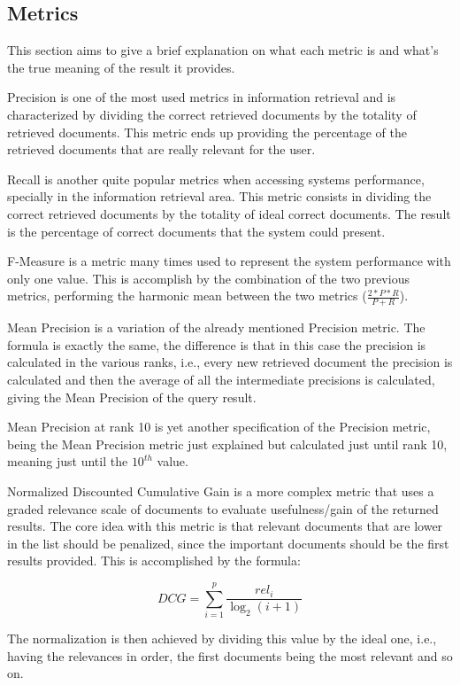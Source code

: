 \documentclass[12pt]{article}
\begin{document}
\subsection{Metrics}
This section aims to give a brief explanation on what each metric is and what's the true meaning of the result it provides.

Precision is one of the most used metrics in information retrieval and is characterized by dividing the correct retrieved documents by the totality of retrieved documents. This metric ends up providing the percentage of the retrieved documents that are really relevant for the user.

Recall is another quite popular metrics when accessing systems performance, specially in the information retrieval area. This metric consists in dividing the correct retrieved documents by the totality of ideal correct documents. The result is the percentage of correct documents that the system could present.

F-Measure is a metric many times used to represent the system performance with only one value. This is accomplish by the combination of the two previous metrics, performing the harmonic mean between the two metrics ($\frac{2*P*R}{P+R}$).

Mean Precision is a variation of the already mentioned Precision metric. The formula is exactly the same, the difference is that in this case the precision is calculated in the various ranks, i.e., every new retrieved document the precision is calculated and then the average of all the intermediate precisions is calculated, giving the Mean Precision of the query result.

Mean Precision at rank 10 is yet another specification of the Precision metric, being the Mean Precision metric just explained but calculated just until rank 10, meaning just until the $10^{th}$ value.

Normalized Discounted Cumulative Gain is a more complex metric that uses a graded relevance scale of documents to evaluate usefulness/gain of the returned results. The core idea with this metric is that relevant documents that are lower in the list should be penalized, since the important documents should be the first results provided. This is accomplished by the formula:

\begin{equation}
  DCG = \sum_{i=1}^{p} \frac{rel_{i}}{\log_{2}(i+1)}
\end{equation}

The normalization is then achieved by dividing this value by the ideal one, i.e., having the relevances in order, the first documents being the most relevant and so on.
\end{document}
